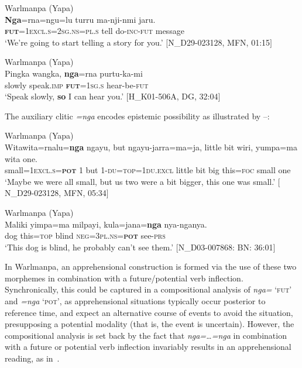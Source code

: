 \documentclass[output=paper,colorlinks,citecolor=brown]{langscibook}
\begin{document}
\ea 
\textnormal{Warlmanpa (Yapa)} \\
\gll \textbf{Nga}=rna=ngu=lu turru ma-nji-nmi jaru. \\
\textsc{\textbf{fut}=1excl.s=2sg.ns=pl.s} tell do-\textsc{inc-fut} message \\
\glt `We’re going to start telling a story for you.' $[$N\_D29-023128, MFN, 01:15$]$
\label{ex:bro52}
\z

\ea 
\textnormal{Warlmanpa (Yapa)} \\
\gll Pingka wangka, \textbf{nga}=rna purtu-ka-mi \\
slowly speak.\textsc{imp} \textsc{\textbf{fut}=1sg.s} hear-be-\textsc{fut} \\
\glt `Speak slowly, \textbf{so} I can hear you.' $[$H\_K01-506A, DG, 32:04$]$
\label{ex:bro53}
\z

The auxiliary clitic \textit{=nga} encodes epistemic possibility as illustrated by --:

\ea 
\textnormal{Warlmanpa (Yapa)} \\
\gll Witawita=rnalu=\textbf{nga} ngayu, but ngayu-jarra=ma=ja, little bit wiri, yumpa=ma wita one. \\
small=\textsc{1excl.s=\textbf{pot}} 1 but 1-\textsc{du=top=1du.excl} little bit big this=\textsc{foc} small one \\
\glt `Maybe we were all small, but us two were a bit bigger, this one was small.' $[$N\_D29-023128, MFN, 05:34$]$
\label{ex:bro54}
\z

\ea 
\textnormal{Warlmanpa (Yapa)} \\
\gll Maliki yimpa=ma milpayi, kula=jana=\textbf{nga} nya-nganya. \\
dog this=\textsc{top} blind \textsc{neg=3pl.ns=\textbf{pot}} see-\textsc{prs} \\
\glt `This dog is blind, he probably can't see them.' $[$N\_D03-007868: BN: 36:01$]$
\label{ex:bro55}
\z


 In Warlmanpa, an apprehensional construction is formed via the use of these two morphemes in combination with a future/potential verb inflection. Synchronically, this could be captured in a compositional analysis of \textit{nga=} \textsc{`fut'} and \textit{=nga} \textsc{`pot'}, as apprehensional situations typically occur posterior to reference time, and expect an alternative course of events to avoid the situation, presupposing a potential modality (that is, the event is uncertain). However, the compositional analysis is set back by the fact that \textit{nga=\ldots=nga} in combination with a future or potential verb inflection invariably results in an apprehensional reading, as in~.
\end{document}
